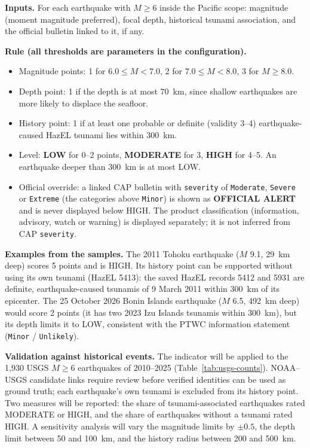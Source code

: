 \documentclass[a4paper,11pt,oneside]{book}
\begin{document}
\textbf{Inputs.} For each earthquake with $M \geq 6$ inside the Pacific scope: magnitude (moment magnitude preferred), focal depth, historical tsunami association, and the official bulletin linked to it, if any.

\textbf{Rule (all thresholds are parameters in the configuration).}
\begin{itemize}[nosep]
  \item Magnitude points: 1 for $6.0 \leq M < 7.0$, 2 for $7.0 \leq M < 8.0$, 3 for $M \geq 8.0$.
  \item Depth point: 1 if the depth is at most 70~km, since shallow earthquakes are more likely to displace the seafloor.
  \item History point: 1 if at least one probable or definite (validity 3--4) earthquake-caused HazEL tsunami lies within 300~km.
  \item Level: \textbf{LOW} for 0--2 points, \textbf{MODERATE} for 3, \textbf{HIGH} for 4--5. An earthquake deeper than 300~km is at most LOW.
  \item Official override: a linked CAP bulletin with \texttt{severity} of \texttt{Moderate}, \texttt{Severe} or \texttt{Extreme} (the categories above \texttt{Minor}) is shown as \textbf{OFFICIAL ALERT} and is never displayed below HIGH. The product classification (information, advisory, watch or warning) is displayed separately; it is not inferred from CAP \texttt{severity}.
\end{itemize}

\textbf{Examples from the samples.} The 2011 Tohoku earthquake ($M$ 9.1, 29~km deep) scores 5 points and is HIGH. Its history point can be supported without using its own tsunami (HazEL 5413): the saved HazEL records 5412 and 5931 are definite, earthquake-caused tsunamis of 9 March 2011 within 300~km of its epicenter.
The 25 October 2026 Bonin Islands earthquake ($M$ 6.5, 492~km deep) would score 2 points (it has two 2023 Izu Islands tsunamis within 300~km), but its depth limits it to LOW, consistent with the PTWC information statement (\texttt{Minor} / \texttt{Unlikely}).

\textbf{Validation against historical events.} The indicator will be applied to the 1,930 USGS $M \geq 6$ earthquakes of 2010--2025 (Table~\ref{tab:usgs-counts}). NOAA--USGS candidate links require review before verified identities can be used as ground truth; each earthquake's own tsunami is excluded from its history point.
Two measures will be reported: the share of tsunami-associated earthquakes rated MODERATE or HIGH, and the share of earthquakes without a tsunami rated HIGH.
A sensitivity analysis will vary the magnitude limits by $\pm 0.5$, the depth limit between 50 and 100~km, and the history radius between 200 and 500~km.
\end{document}
